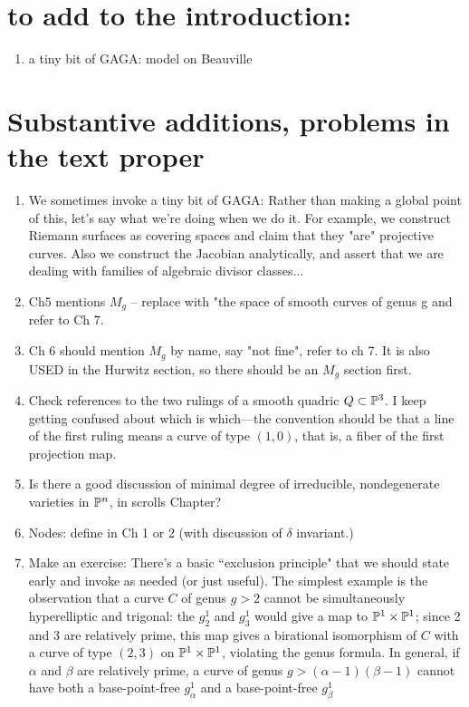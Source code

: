 \documentclass[12pt, leqno]{book}
\begin{document}
\section {to add to the introduction:}
\begin{enumerate}

\item a tiny bit of GAGA: model on Beauville
 \end{enumerate}
 

\section{Substantive additions, problems in the text proper}


\begin{enumerate}
 
 \item We sometimes invoke a tiny bit of GAGA: Rather than making a global point of this, let's say what we're doing when we do it. For example, we construct Riemann surfaces
 as covering spaces and claim that they "are" projective curves. Also we construct the Jacobian analytically, and assert that
 we are dealing with families of algebraic divisor classes...
 
 \item Ch5 mentions $M_g$ -- replace with "the space of smooth curves of genus g and refer to Ch 7.
 
 \item Ch 6 should mention $M_g$ by name, say "not fine", refer to ch 7. It is also USED in the Hurwitz section, so there should be an $M_g$ section first.
 
 
\item Check references to the two rulings of a smooth quadric $Q \subset {\mathbb P}^3$. I keep getting confused about which is which---the convention should be that a line of the first ruling means a curve of type $(1,0)$, that is, a fiber of the first projection map.

\item Is there a good discussion of minimal degree of irreducible, nondegenerate varieties in ${\mathbb P}^n$, in scrolls Chapter?

\item Nodes: define in Ch 1 or 2 (with discussion of $\delta$ invariant.)


\item Make an exercise: There's a basic ``exclusion principle" that we should state early and invoke as needed (or just useful). The simplest example is the observation that a curve $C$ of genus $g > 2$ cannot be simultaneously hyperelliptic and trigonal: the $g^1_2$ and $g^1_3$ would give a map to ${\mathbb P}^1 \times {\mathbb P}^1$; since 2 and 3 are relatively prime, this map gives a birational isomorphism of $C$ with a curve of type $(2,3)$ on ${\mathbb P}^1 \times {\mathbb P}^1$, violating the genus formula. In general, if $\alpha$ and $\beta$ are relatively prime, a curve of genus $g > (\alpha - 1)(\beta - 1)$ cannot have both a base-point-free $g^1_\alpha$ and a base-point-free $g^1_\beta$



\end{enumerate}
\end{document}
